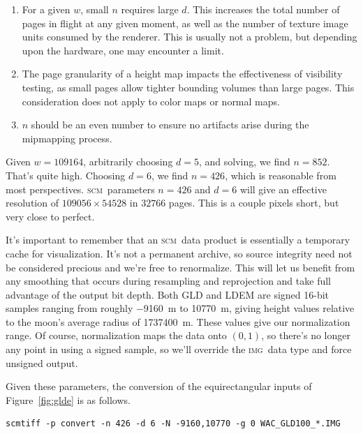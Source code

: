 \documentclass[oneside,10pt]{memoir}
\newcommand{\scm}     {\textsc{scm}}
\newcommand{\img}     {\textsc{img}}
\begin{document}
\begin{Spacing}{1.1}
\begin{enumerate}
\item For a given $w$, small $n$ requires large $d$. This increases the total number of pages in flight at any given moment, as well as the number of texture image units consumed by the renderer. This is usually not a problem, but depending upon the hardware, one may encounter a limit.

\item The page granularity of a height map impacts the effectiveness of visibility testing, as small pages allow tighter bounding volumes than large pages. This consideration does not apply to color maps or normal maps.

\item $n$ should be an even number to ensure no artifacts arise during the mipmapping process.
\end{enumerate}

Given $w=\num{109164}$, arbitrarily choosing $d=5$, and solving, we find $n=852$. That's quite high. Choosing $d=6$, we find $n=426$, which is reasonable from most perspectives. \scm\ parameters $n=426$ and $d=6$ will give an effective resolution of $\num{109056}\times\num{54528}$ in $\num{32766}$ pages. This is a couple pixels short, but very close to perfect.

It's important to remember that an \scm\ data product is essentially a temporary cache for visualization. It's not a permanent archive, so source integrity need not be considered precious and we're free to renormalize. This will let us benefit from any smoothing that occurs during resampling and reprojection and take full advantage of the output bit depth. Both GLD and LDEM are signed 16-bit samples ranging from roughly \SI{-9160}{\meter} to \SI{10770}{\meter}, giving height values relative to the moon's average radius of \SI{1737400}{\meter}. These values give our normalization range. Of course, normalization maps the data onto $(0,1)$, so there's no longer any point in using a signed sample, so we'll override the \img\ data type and force unsigned output.

Given these parameters, the conversion of the equirectangular inputs of Figure~\ref{fig:glde} is as follows.

\begin{Verbatim}
scmtiff -p convert -n 426 -d 6 -N -9160,10770 -g 0 WAC_GLD100_*.IMG
\end{Verbatim}


\end{Spacing}
\end{document}
